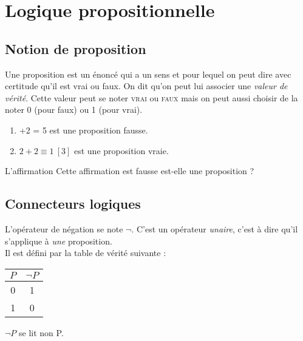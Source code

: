 \documentclass[a4paper,12pt,french]{book}
\begin{document}
	\chapter{Logique propositionnelle}
	\section{Notion de proposition}
	\begin{definition}[ : proposition]
		Une proposition est un énoncé qui a un sens et pour lequel on peut dire avec certitude qu'il est vrai ou faux. On dit qu'on peut lui associer une \textit{valeur de vérité}. Cette valeur peut se noter \textsc{vrai} ou \textsc{faux} mais on peut aussi choisir de la noter 0 (pour faux) ou 1 (pour vrai).
	\end{definition}

	\begin{exemple}[s]
		\begin{enumerate}[\textbullet]
			\item 	{}+2 = 5\fg{} est une proposition fausse.
			\item 	\og $2+2\equiv 1\ [3]$\fg{} est une proposition vraie.
		\end{enumerate}
	\end{exemple}

	\begin{exercice}[]
		L'affirmation \og Cette affirmation est fausse\fg{} est-elle une proposition ?
	\end{exercice}
	\section{Connecteurs logiques}
	\begin{definition}
		L'opérateur de négation se note $\neg$. C'est un opérateur \textit{unaire}, c'est à dire qu'il s'applique à \textit{une} proposition.\\
		Il est défini par la table de vérité suivante :
		\begin{center}
		\begin{tabular}{|c|c|}
			\hline
			\rowcolor{lightgray}
			$P$ & $\neg P$ \\
			\hline
			\rowcolor{white}
			0 & 1 \\
			\hline
			\rowcolor{white}
			1 & 0 \\
			\hline
		\end{tabular}
		\end{center}
		$\neg P$ se lit \og non P\fg{}.
	\end{definition}
\end{document}
